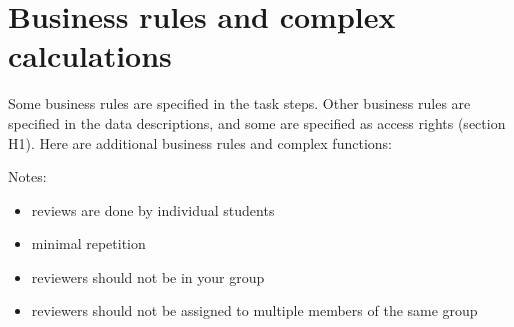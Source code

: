 \documentclass[Main]{subfiles}
\begin{document}
\section{Business rules and complex calculations}
Some business rules are specified in the task steps. Other business rules are specified in the data descriptions, and some are specified as access rights (section H1). Here are additional business rules and complex functions:


\begin{FunctionTable}
\end{FunctionTable}

Notes:
\begin{itemize}
\item reviews are done by individual students
\item minimal repetition
\item reviewers should not be in your group
\item reviewers should not be assigned to multiple members of the same group
\end{itemize}
\end{document}
